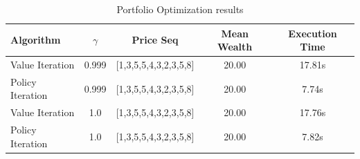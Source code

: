 \documentclass[12pt]{article}
\begin{document}
\begin{table}[H]
\centering
\caption{Portfolio Optimization results}
\begin{tabular}{lcccc}
\toprule
Algorithm & $\gamma$ & Price Seq & Mean Wealth & Execution Time \\
\midrule
Value Iteration & 0.999 & [1,3,5,5,4,3,2,3,5,8] & 20.00 & 17.81s \\
Policy Iteration & 0.999 & [1,3,5,5,4,3,2,3,5,8] & 20.00 & 7.74s \\
Value Iteration & 1.0 & [1,3,5,5,4,3,2,3,5,8] & 20.00 & 17.76s \\
Policy Iteration & 1.0 & [1,3,5,5,4,3,2,3,5,8] & 20.00 & 7.82s \\
\bottomrule
\end{tabular}
\end{table}
\end{document}
